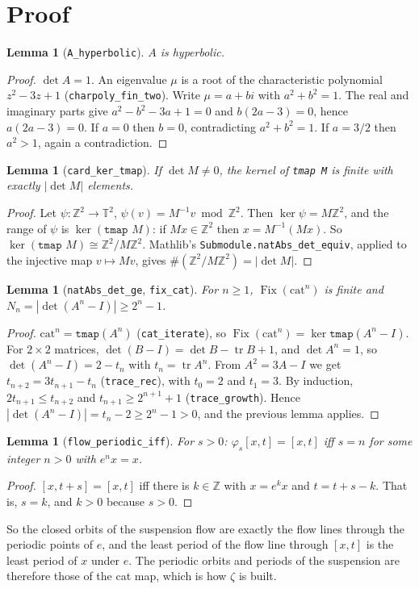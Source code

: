 \documentclass[11pt]{article}
\newtheorem{lemma}[theorem]{Lemma}
\theoremstyle{definition}
\newcommand{\tr}{\operatorname{tr}}
\newcommand{\Fix}{\operatorname{Fix}}
\newcommand{\Z}{\mathbb{Z}}
\newcommand{\T}{\mathbb{T}}
\begin{document}
\section{Proof}

\begin{lemma}[\texttt{A\_hyperbolic}]
$A$ is hyperbolic.
\end{lemma}
\begin{proof}
$\det A=1$. An eigenvalue $\mu$ is a root of the characteristic polynomial $z^2-3z+1$
(\texttt{charpoly\_fin\_two}). Write $\mu=a+bi$ with $a^2+b^2=1$. The real and imaginary parts give
$a^2-b^2-3a+1=0$ and $b(2a-3)=0$, hence $a(2a-3)=0$. If $a=0$ then $b=0$, contradicting
$a^2+b^2=1$. If $a=3/2$ then $a^2>1$, again a contradiction.
\end{proof}

\begin{lemma}[\texttt{card\_ker\_tmap}]
If $\det M\neq0$, the kernel of \texttt{tmap M} is finite with exactly $|\det M|$ elements.
\end{lemma}
\begin{proof}
Let $\psi:\Z^2\to\T^2$, $\psi(v)=M^{-1}v\bmod\Z^2$. Then $\ker\psi=M\Z^2$, and the range of $\psi$ is
$\ker(\texttt{tmap }M)$: if $Mx\in\Z^2$ then $x=M^{-1}(Mx)$. So $\ker(\texttt{tmap }M)\cong\Z^2/M\Z^2$.
Mathlib's \texttt{Submodule.natAbs\_det\_equiv}, applied to the injective map $v\mapsto Mv$, gives
$\#(\Z^2/M\Z^2)=|\det M|$.
\end{proof}

\begin{lemma}[\texttt{natAbs\_det\_ge}, \texttt{fix\_cat}]
For $n\ge1$, $\Fix(\mathrm{cat}^n)$ is finite and $N_n=|\det(A^n-I)|\ge 2^n-1$.
\end{lemma}
\begin{proof}
$\mathrm{cat}^n=\texttt{tmap}(A^n)$ (\texttt{cat\_iterate}), so $\Fix(\mathrm{cat}^n)=\ker\texttt{tmap}(A^n-I)$.
For $2\times2$ matrices, $\det(B-I)=\det B-\tr B+1$, and $\det A^n=1$, so $\det(A^n-I)=2-t_n$ with
$t_n=\tr A^n$. From $A^2=3A-I$ we get $t_{n+2}=3t_{n+1}-t_n$ (\texttt{trace\_rec}), with $t_0=2$ and
$t_1=3$. By induction, $2t_{n+1}\le t_{n+2}$ and $t_{n+1}\ge2^{n+1}+1$ (\texttt{trace\_growth}). Hence
$|\det(A^n-I)|=t_n-2\ge2^n-1>0$, and the previous lemma applies.
\end{proof}

\begin{lemma}[\texttt{flow\_periodic\_iff}]
For $s>0$: $\varphi_s[x,t]=[x,t]$ iff $s=n$ for some integer $n>0$ with $e^n x=x$.
\end{lemma}
\begin{proof}
$[x,t+s]=[x,t]$ iff there is $k\in\Z$ with $x=e^kx$ and $t=t+s-k$. That is, $s=k$, and $k>0$
because $s>0$.
\end{proof}
So the closed orbits of the suspension flow are exactly the flow lines through the periodic points
of $e$, and the least period of the flow line through $[x,t]$ is the least period of $x$ under $e$.
The periodic orbits and periods of the suspension are therefore those of the cat map, which is how
$\zeta$ is built.
\end{document}
